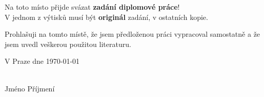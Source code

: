 \documentclass[11pt,a4paper,oneside]{book}
\begin{document}

\newpage

\thispagestyle{empty}

\noindent
{\Large
Na toto místo přijde svázat \textbf{zadání diplomové práce}!\\
V jednom z výtisků musí být \textbf{originál} zadání, v ostatních kopie.\par}


\newpage

\thispagestyle{empty}



\vspace{0.5cm}

Prohlašuji na tomto místě, že jsem předloženou práci vypracoval samostatně 
a že jsem uvedl veškerou použitou literaturu.

\vspace{1.5cm}

\noindent
\begin{minipage}[b]{5cm}
V Praze dne \today
\end{minipage}
\hfill
\begin{minipage}[t]{5cm}
\begin{center}
\dotfill\\
Jméno Příjmení
\end{center}
\end{minipage}

\vspace*{2cm}


\newpage

\thispagestyle{empty}
\end{document}
